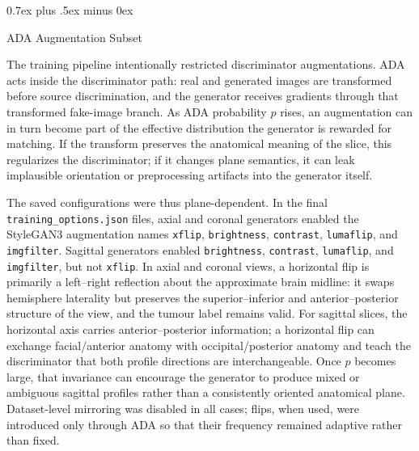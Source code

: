 \documentclass[conference,twoside]{IEEEtran}
\makeatletter
\newcommand{\bodyfont}{\rmfamily}
\def\subsection{\@startsection{subsection}{2}{\z@}{1.5ex plus 1.5ex minus 0.5ex}%
{0.7ex plus .5ex minus 0ex}{\normalfont\normalsize\bodyfont\bfseries\raggedright}}
\makeatother
\begin{document}
\subsection{ADA Augmentation Subset}

The training pipeline intentionally restricted discriminator augmentations. ADA acts inside the discriminator path: real and generated images are transformed before source discrimination, and the generator receives gradients through that transformed fake-image branch. As ADA probability $p$ rises, an augmentation can in turn become part of the effective distribution the generator is rewarded for matching. If the transform preserves the anatomical meaning of the slice, this regularizes the discriminator; if it changes plane semantics, it can leak implausible orientation or preprocessing artifacts into the generator itself.

The saved configurations were thus plane-dependent. In the final \texttt{training\_options.json} files, axial and coronal generators enabled the StyleGAN3 augmentation names \texttt{xflip}, \texttt{brightness}, \texttt{contrast}, \texttt{lumaflip}, and \texttt{imgfilter}. Sagittal generators enabled \texttt{brightness}, \texttt{contrast}, \texttt{lumaflip}, and \texttt{imgfilter}, but not \texttt{xflip}. In axial and coronal views, a horizontal flip is primarily a left--right reflection about the approximate brain midline: it swaps hemisphere laterality but preserves the superior--inferior and anterior--posterior structure of the view, and the tumour label remains valid. For sagittal slices, the horizontal axis carries anterior--posterior information; a horizontal flip can exchange facial/anterior anatomy with occipital/posterior anatomy and teach the discriminator that both profile directions are interchangeable. Once $p$ becomes large, that invariance can encourage the generator to produce mixed or ambiguous sagittal profiles rather than a consistently oriented anatomical plane. Dataset-level mirroring was disabled in all cases; flips, when used, were introduced only through ADA so that their frequency remained adaptive rather than fixed.
\end{document}
